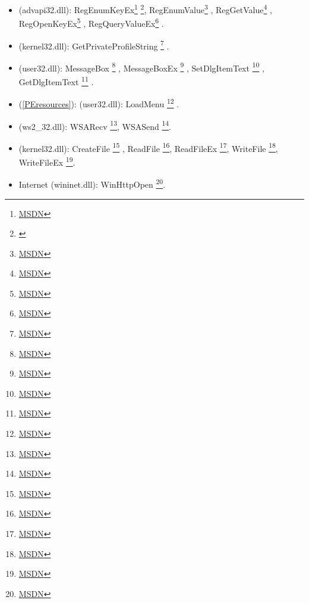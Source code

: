 \begin{itemize}

\item
{} (advapi32.dll): 
RegEnumKeyEx\footnote{\href{http://go.yurichev.com/17228}{MSDN}}
\footnote{
	\label{note1}},
RegEnumValue\footnote{\href{http://go.yurichev.com/17229}{MSDN}}
,
RegGetValue\footnote{\href{http://go.yurichev.com/17230}{MSDN}}
,
RegOpenKeyEx\footnote{\href{http://go.yurichev.com/17231}{MSDN}}
,
RegQueryValueEx\footnote{\href{http://go.yurichev.com/17232}{MSDN}}
.

\item
{} (kernel32.dll): 
GetPrivateProfileString
\footnote{\href{http://go.yurichev.com/17233}{MSDN}}
.

\item
{} (user32.dll): 
MessageBox
\footnote{\href{http://go.yurichev.com/17234}{MSDN}}
, 
MessageBoxEx
\footnote{\href{http://go.yurichev.com/17235}{MSDN}}
,
SetDlgItemText
\footnote{\href{http://go.yurichev.com/17236}{MSDN}}
,
GetDlgItemText
\footnote{\href{http://go.yurichev.com/17237}{MSDN}}
.

\item
{}(\ref{PEresources}): (user32.dll): LoadMenu
\footnote{\href{http://go.yurichev.com/17238}{MSDN}}
.
\item
{} (ws2\_32.dll):
WSARecv
\footnote{\href{http://go.yurichev.com/17239}{MSDN}},
WSASend
\footnote{\href{http://go.yurichev.com/17240}{MSDN}}.

\item
{} (kernel32.dll):
CreateFile
\footnote{\href{http://go.yurichev.com/17241}{MSDN}}
,
ReadFile
\footnote{\href{http://go.yurichev.com/17242}{MSDN}},
ReadFileEx
\footnote{\href{http://go.yurichev.com/17243}{MSDN}},
WriteFile
\footnote{\href{http://go.yurichev.com/17244}{MSDN}},
WriteFileEx
\footnote{\href{http://go.yurichev.com/17245}{MSDN}}.

\item
{} Internet
(wininet.dll):
WinHttpOpen
\footnote{\href{http://go.yurichev.com/17246}{MSDN}}.


\end{itemize}
